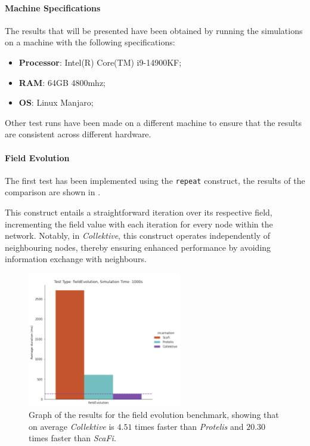 \paragraph{Machine Specifications}
The results that will be presented have been obtained by running the simulations on a machine with the following specifications:
\begin{itemize}
    \item \textbf{Processor}: Intel(R) Core(TM) i9-14900KF;
    \item \textbf{RAM}: 64GB 4800mhz;
    \item \textbf{OS}: Linux Manjaro;
\end{itemize}

Other test runs have been made on a different machine to ensure that the results are consistent across different hardware.

\paragraph{Field Evolution}
The first test has been implemented using the \texttt{repeat} construct, the results of the comparison are shown in .

This construct entails a straightforward iteration over its respective field, incrementing the field value with each
iteration for every node within the network.
Notably, in \emph{Collektive}, this construct operates independently of neighbouring nodes, thereby ensuring enhanced
performance by avoiding information exchange with neighbours.

\begin{figure}[ht!]
    \centering
    \includegraphics[width=0.6\textwidth]{figures/field-evolution-results}
    \caption{Graph of the results for the field evolution benchmark, showing that on average \emph{Collektive} is $4.51$ times faster
        than \emph{Protelis} and $20.30$ times faster than \emph{ScaFi}.}
    \label{fig:field-evolution}
\end{figure}

